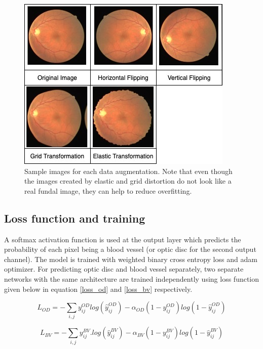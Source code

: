 \begin{figure}[!ht]
  \centering
  \includegraphics[width=\linewidth]{images/Data_Augmentation.jpg}
  \caption{Sample images for each data augmentation. Note that even though the images created by elastic and grid distortion do not look like a real fundal image, they can help to reduce overfitting.}
  \label{data_augmentation}
\end{figure}

\subsection{Loss function and training}
A softmax activation function is used at the output layer which predicts the probability of each pixel being a blood vessel (or optic disc for the second output channel).
The model is trained with weighted binary cross entropy loss and adam optimizer.
For predicting optic disc and blood vessel separately,  two separate networks with the same architecture are trained independently using loss function given below in equation \ref{loss_od} and \ref{loss_bv} respectively.

\begin{equation}\label{loss_od}
L_{OD} = -\sum_{i,j} y_{ij}^{OD}log(\hat{y}_{ij}^{OD} ) - \alpha_{OD}(1-y_{ij}^{OD} )log(1-\hat{y}_{ij}^{OD})
\end{equation}

\begin{equation}\label{loss_bv}
L_{BV} = -\sum_{i,j} y_{ij}^{BV}.log(\hat{y}_{ij}^{BV}) - \alpha_{BV}(1-y_{ij}^{BV})log(1-\hat{y}_{ij}^{BV})
\end{equation}

